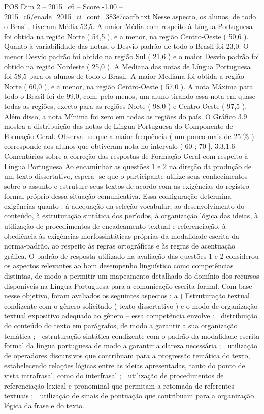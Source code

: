 \begin{textsample}{POS Dim 2 – 2015\_c6 – Score -1.00 – 2015\_c6/enade\_2015\_ci\_cont\_383e7cacfb.txt}
Nesse aspecto, os alunos, de todo o Brasil, tiveram Média 52,5.
A maior Média com respeito à Língua Portuguesa foi obtida na região Norte ( 54,5 ), e a menor, na região Centro-Oeste ( 50,6 ).
Quanto à variabilidade das notas, o Desvio padrão de todo o Brasil foi 23,0.
O menor Desvio padrão foi obtido na região Sul ( 21,6 ) e o maior Desvio padrão foi obtido na região Nordeste ( 25,0 ).
A Mediana das notas de Língua Portuguesa foi 58,5 para os alunos de todo o Brasil.
A maior Mediana foi obtida a região Norte ( 60,0 ), e a menor, na região Centro-Oeste ( 57,0 ).
A nota Máxima para todo o Brasil foi de 99,0, com, pelo menos, um aluno tirando essa nota em quase todas as regiões, exceto para as regiões Norte ( 98,0 ) e Centro-Oeste ( 97,5 ).
Além disso, a nota Mínima foi zero em todas as regiões do país.
O Gráfico 3.9 mostra a distribuição das notas de Língua Portuguesa do Componente de Formação Geral.
Observa -se que a maior frequência ( um pouco mais de 25 \% ) corresponde aos alunos que obtiveram nota no intervalo ( 60 ; 70 ]. 3.3.1.6 Comentários sobre a correção das respostas de Formação Geral com respeito à Língua Portuguesa Ao encaminhar as questões 1 e 2 na direção da produção de um texto dissertativo, espera -se que o participante utilize seus conhecimentos sobre o assunto e estruture seus textos de acordo com as exigências do registro formal próprio dessa situação comunicativa.
Essa configuração determina exigências quanto : à adequação da seleção vocabular, ao desenvolvimento do conteúdo, à estruturação sintática dos períodos, à organização lógica das ideias, à utilização de procedimentos de encadeamento textual e referenciação, à obediência às exigências morfossintáticas próprias da modalidade escrita da norma-padrão, ao respeito às regras ortográficas e às regras de acentuação gráfica.
O padrão de resposta utilizado na avaliação das questões 1 e 2 considerou os aspectos relevantes ao bom desempenho linguístico como competências distintas, de modo a permitir um mapeamento detalhado do domínio dos recursos disponíveis na Língua Portuguesa para a comunicação escrita formal.
Com base nesse objetivo, foram avaliados os seguintes aspectos : a ) Estruturação textual condizente com o gênero solicitado ( texto dissertativo ) e o modo de organização textual expositivo adequado ao gênero – essa competência envolve :  distribuição do conteúdo do texto em parágrafos, de modo a garantir a sua organização temática ;  estruturação sintática condizente com o padrão da modalidade escrita formal da língua portuguesa de modo a garantir a clareza necessária ;  utilização de operadores discursivos que contribuam para a progressão temática do texto, estabelecendo relações lógicas entre as ideias apresentadas, tanto do ponto de vista intrafrasal, como do interfrasal ;  utilização de procedimentos de referenciação lexical e pronominal que permitam a retomada de referentes textuais ;  utilização de sinais de pontuação que contribuam para a organização lógica da frase e do texto.

\end{textsample}
